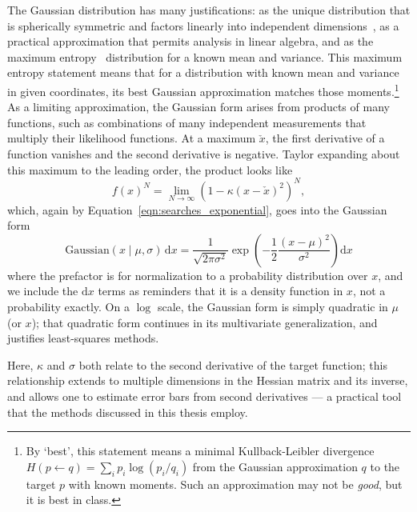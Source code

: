 The Gaussian distribution has many justifications:
as the unique distribution that is spherically symmetric and factors linearly
into independent dimensions~\cite{
jaynes2003probability,
herschel1850normal,
maxwell1860normal,
muller1959note,
marsaglia1972normal
},
as a practical approximation that permits analysis in linear algebra,
and as the maximum entropy~\cite{PhysRev.106.620} distribution for a
known mean and variance.
This maximum entropy statement means that for a distribution with known mean
and variance in given coordinates, its best Gaussian approximation matches
those moments.\footnote{%
By `best', this statement means a minimal Kullback-Leibler divergence
\(
H(p\leftarrow q) = \sum_i p_i \log(p_i/q_i)
\)
from the Gaussian approximation $q$ to the target $p$ with known moments.
Such an approximation may not be \emph{good}, but it is best in class.%
}
As a limiting approximation, the Gaussian form arises from products of many
functions, such as combinations of many independent measurements that multiply
their likelihood functions.
At a maximum $\check{x}$, the first derivative of a function vanishes and the
second derivative is negative.
Taylor expanding about this maximum to the leading order, the product looks like
\begin{equation}
f(x)^N = \displaystyle \lim_{N \to \infty}
\left(
1 - \kappa (x - \check{x})^2
\right)^N,
\end{equation}
which, again by Equation~\ref{eqn:searches_exponential}, goes into the Gaussian
form
\begin{equation}
\label{eqn:searches_gaussian}
\mathrm{Gaussian}(x\mid \mu, \sigma)
\,\mathrm{d}x =
\frac{1}{\sqrt{2\pi \sigma^2}}
\exp\!\left(-\frac{1}{2}\frac{(x - \mu)^2}{\sigma^2}\right)
\mathrm{d}x
\end{equation}
where the prefactor is for normalization to a probability distribution over
$x$, and we include the $\mathrm{d}x$ terms as reminders that it is a density
function in $x$, not a probability exactly.
On a $\log$ scale, the Gaussian form is simply quadratic in $\mu$ (or $x$);
that quadratic form continues in its multivariate generalization, and
justifies least-squares methods.

Here, $\kappa$ and $\sigma$ both relate to the second derivative of the target
function; this relationship extends to multiple dimensions in the Hessian
matrix and its inverse, and allows one to estimate error bars from second
derivatives --- a practical tool that the methods discussed in this thesis
employ.

